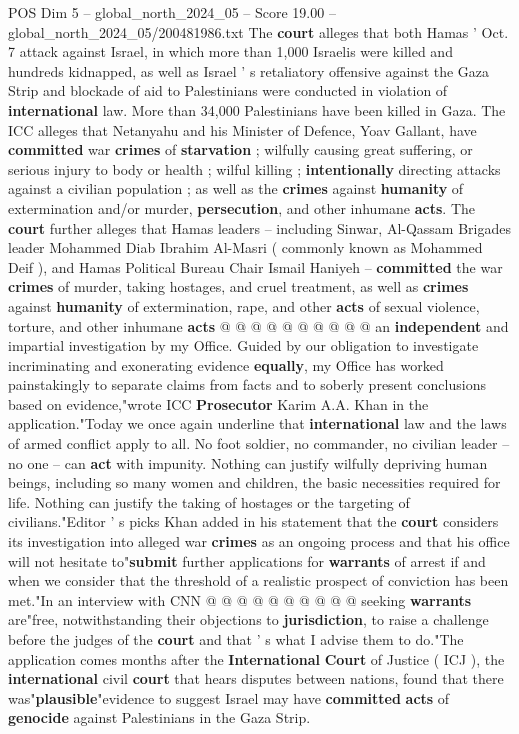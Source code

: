 \begin{textsample}{POS Dim 5 – global\_north\_2024\_05 – Score 19.00 – global\_north\_2024\_05/200481986.txt}  \label{ex:f5_pos_166}
The \textbf{court} alleges that both Hamas ' Oct. 7 attack against Israel, in which more than 1,000 Israelis were killed and hundreds kidnapped, as well as Israel ' s retaliatory offensive against the Gaza Strip and blockade of aid to Palestinians were conducted in violation of \textbf{international} law.
More than 34,000 Palestinians have been killed in Gaza.
The ICC alleges that Netanyahu and his Minister of Defence, Yoav Gallant, have \textbf{committed} war \textbf{crimes} of \textbf{starvation} ; wilfully causing great suffering, or serious injury to body or health ; wilful killing ; \textbf{intentionally} directing attacks against a civilian population ; as well as the \textbf{crimes} against \textbf{humanity} of extermination and/or murder, \textbf{persecution}, and other inhumane \textbf{acts}.
The \textbf{court} further alleges that Hamas leaders -- including Sinwar, Al-Qassam Brigades leader Mohammed Diab Ibrahim Al-Masri ( commonly known as Mohammed Deif ), and Hamas Political Bureau Chair Ismail Haniyeh -- \textbf{committed} the war \textbf{crimes} of murder, taking hostages, and cruel treatment, as well as \textbf{crimes} against \textbf{humanity} of extermination, rape, and other \textbf{acts} of sexual violence, torture, and other inhumane \textbf{acts} @ @ @ @ @ @ @ @ @ @ an \textbf{independent} and impartial investigation by my Office.
Guided by our obligation to investigate incriminating and exonerating evidence \textbf{equally}, my Office has worked painstakingly to separate claims from facts and to soberly present conclusions based on evidence,"wrote ICC \textbf{Prosecutor} Karim A.A.
Khan in the application."Today we once again underline that \textbf{international} law and the laws of armed conflict apply to all.
No foot soldier, no commander, no civilian leader -- no one -- can \textbf{act} with impunity.
Nothing can justify wilfully depriving human beings, including so many women and children, the basic necessities required for life.
Nothing can justify the taking of hostages or the targeting of civilians."Editor ' s picks Khan added in his statement that the \textbf{court} considers its investigation into alleged war \textbf{crimes} as an ongoing process and that his office will not hesitate to"\textbf{submit} further applications for \textbf{warrants} of arrest if and when we consider that the threshold of a realistic prospect of conviction has been met."In an interview with CNN @ @ @ @ @ @ @ @ @ @ seeking \textbf{warrants} are"free, notwithstanding their objections to \textbf{jurisdiction}, to raise a challenge before the judges of the \textbf{court} and that ' s what I advise them to do."The application comes months after the \textbf{International} \textbf{Court} of Justice ( ICJ ), the \textbf{international} civil \textbf{court} that hears disputes between nations, found that there was"\textbf{plausible}"evidence to suggest Israel may have \textbf{committed} \textbf{acts} of \textbf{genocide} against Palestinians in the Gaza Strip.

\end{textsample}

